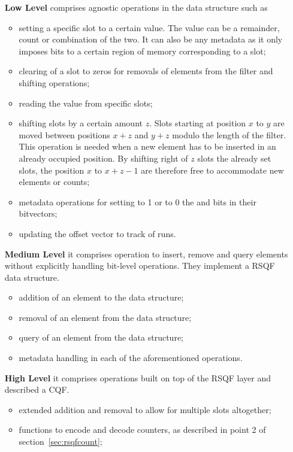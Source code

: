\begin{itemize}[leftmargin=1.8cm]
	\item[\textbf{Low Level}] comprises agnostic operations in the data structure such as
	\begin{itemize}
		\item setting a specific slot to a certain value. The value can be a remainder, count or combination of the two. It can also be any metadata as it only imposes bits to a certain region of memory corresponding to a slot;
		\item clearing of a slot to zeros for removals of elements from the filter and shifting operations;
		\item reading the value from specific slots;
		\item shifting slots by a certain amount $z$. Slots starting at position $x$ to $y$ are moved between positions $x+z$ and $y+z$ modulo the length of the filter. This operation is needed when a new element has to be inserted in an already occupied position. By shifting right of $z$ slots the already set slots, the position $x$ to $x+z-1$ are therefore free to accommodate new elements or counts;
		\item metadata operations for setting to 1 or to 0 the \occs and \rends bits in their bitvectors;
		\item updating the offset vector to track of runs.
	\end{itemize}
	\item[\textbf{Medium Level}] it comprises operation to insert, remove and query elements without explicitly handling bit-level operations. They implement a RSQF data structure.
	\begin{itemize}
		\item addition of an element to the data structure;
		\item removal of an element from the data structure;
		\item query of an element from the data structure;
		\item metadata handling in each of the aforementioned operations.
	\end{itemize}
	\item[\textbf{High Level}] it comprises operations built on top of the RSQF layer and described a CQF.
	\begin{itemize}
		\item extended addition and removal to allow for multiple slots altogether;
		\item functions to encode and decode counters, as described in point 2 of section~\ref{sec:rsqfcount};

\end{itemize}
\end{itemize}
